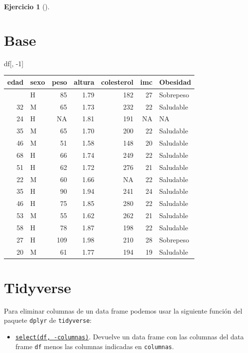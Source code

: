 \documentclass[
  a4paper,
]{scrreport}
\newenvironment{Shaded}{\begin{snugshade}}{\end{snugshade}}
\newcommand{\DecValTok}[1]{\textcolor[rgb]{0.68,0.00,0.00}{#1}}
\newcommand{\NormalTok}[1]{\textcolor[rgb]{0.00,0.23,0.31}{#1}}
\newcommand{\SpecialCharTok}[1]{\textcolor[rgb]{0.37,0.37,0.37}{#1}}
\providecommand{\tightlist}{%
  \setlength{\itemsep}{0pt}\setlength{\parskip}{0pt}}\usepackage{longtable,booktabs,array}
\theoremstyle{definition}
\newtheorem{exercise}{Ejercicio}[chapter]
\theoremstyle{remark}
\begin{document}
\begin{exercise}[]
\begin{enumerate}
\begin{tcolorbox}
  \section{Base}

\begin{Shaded}
\begin{Highlighting}[]
\NormalTok{df[, }\SpecialCharTok{{-}}\DecValTok{1}\NormalTok{]}
\end{Highlighting}
\end{Shaded}

  \begin{longtable}[]{@{}rlrrrrl@{}}
  \toprule\noalign{}
  edad & sexo & peso & altura & colesterol & imc & Obesidad \\
  \midrule\noalign{}
  \endhead
  \bottomrule\noalign{}
  \endlastfoot
  18 & H & 85 & 1.79 & 182 & 27 & Sobrepeso \\
  32 & M & 65 & 1.73 & 232 & 22 & Saludable \\
  24 & H & NA & 1.81 & 191 & NA & NA \\
  35 & M & 65 & 1.70 & 200 & 22 & Saludable \\
  46 & M & 51 & 1.58 & 148 & 20 & Saludable \\
  68 & H & 66 & 1.74 & 249 & 22 & Saludable \\
  51 & H & 62 & 1.72 & 276 & 21 & Saludable \\
  22 & M & 60 & 1.66 & NA & 22 & Saludable \\
  35 & H & 90 & 1.94 & 241 & 24 & Saludable \\
  46 & H & 75 & 1.85 & 280 & 22 & Saludable \\
  53 & M & 55 & 1.62 & 262 & 21 & Saludable \\
  58 & H & 78 & 1.87 & 198 & 22 & Saludable \\
  27 & H & 109 & 1.98 & 210 & 28 & Sobrepeso \\
  20 & M & 61 & 1.77 & 194 & 19 & Saludable \\
  \end{longtable}

  \section{Tidyverse}

  Para eliminar columnas de un data frame podemos usar la siguiente
  función del paquete \texttt{dplyr} de \texttt{tidyverse}:

  \begin{itemize}
  \tightlist
  \item
    \href{https://dplyr.tidyverse.org/reference/select.html}{\texttt{select(df,\ -columnas)}}.
    Devuelve un data frame con las columnas del data frame \texttt{df}
    menos las columnas indicadas en \texttt{columnas}.
  \end{itemize}


\end{tcolorbox}
\end{enumerate}
\end{exercise}
\end{document}
